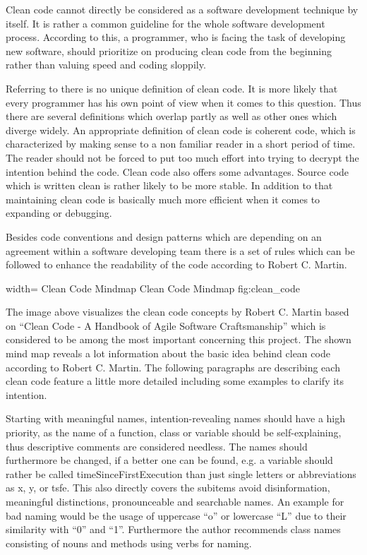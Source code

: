 Clean code cannot directly be considered as a software development technique by itself. It is rather a common guideline for the whole 
software development process. According to this, a programmer, who is facing the task of developing new software, should prioritize on 
producing clean code from the beginning rather than valuing speed and coding sloppily.

Referring to \cite{CLEANCODE} there is no unique definition of clean code. It is more likely that every programmer has his own point of 
view when it comes to this question. Thus there are several definitions which overlap partly as well as other ones which diverge widely. 
An appropriate definition of clean code is coherent code, which is characterized by making sense to a non familiar reader in a short period 
of time. The reader should not be forced to put too much effort into trying to decrypt the intention behind the code. Clean code also offers 
some advantages. Source code which is written clean is rather likely to be more stable. In addition to that maintaining clean code is basically 
much more efficient when it comes to expanding or debugging.

Besides code conventions and design patterns which are depending on an agreement within a software developing team there is a set of rules
which can be followed to enhance the readability of the code according to Robert C. Martin.

 {width=\textwidth}%
 {Clean Code Mindmap}%
 {Clean Code Mindmap}%
 {fig:clean_code}%

The image above visualizes the clean code concepts by Robert C. Martin based on “Clean Code - A Handbook of Agile Software Craftsmanship” 
which is considered to be among the most important concerning this project. The shown mind map reveals a lot information about the basic 
idea behind clean code according to Robert C. Martin. The following paragraphs are describing each clean code feature a little more detailed 
including some examples to clarify its intention.

Starting with meaningful names, intention-revealing names should have a high priority, as the name of a function, class or variable should 
be self-explaining, thus descriptive comments are considered needless. The names should furthermore be changed, if a better one can be found, 
e.g. a variable should rather be called timeSinceFirstExecution than just single letters or abbreviations as x, y, or tsfe. This also directly 
covers the subitems avoid disinformation, meaningful distinctions, pronounceable and searchable names. An example for bad naming would be the 
usage of uppercase “o” or lowercase “L” due to their similarity with “0” and “1”. Furthermore the author recommends class names consisting of 
nouns and methods using verbs for naming.

